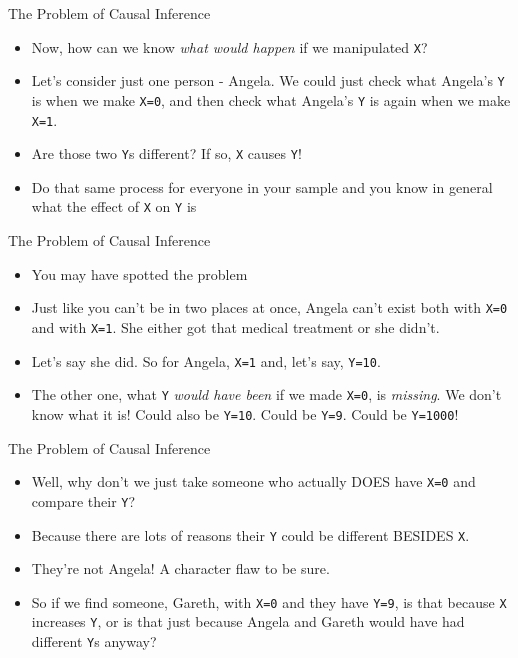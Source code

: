 \documentclass[
  ignorenonframetext,
]{beamer}
\providecommand{\tightlist}{%
  \setlength{\itemsep}{0pt}\setlength{\parskip}{0pt}}
\begin{document}
\begin{frame}[fragile]{The Problem of Causal Inference}
\label{the-problem-of-causal-inference-1}
\begin{itemize}
\tightlist
\item
  Now, how can we know \emph{what would happen} if we manipulated
  \texttt{X}?
\item
  Let's consider just one person - Angela. We could just check what
  Angela's \texttt{Y} is when we make \texttt{X=0}, and then check what
  Angela's \texttt{Y} is again when we make \texttt{X=1}.
\item
  Are those two \texttt{Y}s different? If so, \texttt{X} causes
  \texttt{Y}!
\item
  Do that same process for everyone in your sample and you know in
  general what the effect of \texttt{X} on \texttt{Y} is
\end{itemize}
\end{frame}

\begin{frame}[fragile]{The Problem of Causal Inference}
\label{the-problem-of-causal-inference-2}
\begin{itemize}
\tightlist
\item
  You may have spotted the problem
\item
  Just like you can't be in two places at once, Angela can't exist both
  with \texttt{X=0} and with \texttt{X=1}. She either got that medical
  treatment or she didn't.
\item
  Let's say she did. So for Angela, \texttt{X=1} and, let's say,
  \texttt{Y=10}.
\item
  The other one, what \texttt{Y} \emph{would have been} if we made
  \texttt{X=0}, is \emph{missing}. We don't know what it is! Could also
  be \texttt{Y=10}. Could be \texttt{Y=9}. Could be \texttt{Y=1000}!
\end{itemize}
\end{frame}

\begin{frame}[fragile]{The Problem of Causal Inference}
\label{the-problem-of-causal-inference-3}
\begin{itemize}
\tightlist
\item
  Well, why don't we just take someone who actually DOES have
  \texttt{X=0} and compare their \texttt{Y}?
\item
  Because there are lots of reasons their \texttt{Y} could be different
  BESIDES \texttt{X}.
\item
  They're not Angela! A character flaw to be sure.
\item
  So if we find someone, Gareth, with \texttt{X=0} and they have
  \texttt{Y=9}, is that because \texttt{X} increases \texttt{Y}, or is
  that just because Angela and Gareth would have had different
  \texttt{Y}s anyway?
\end{itemize}
\end{frame}
\end{document}
